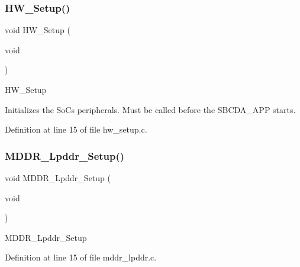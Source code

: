 \mbox{\label{group___h_w___setup_gaccfffcda3887f124927423457befe196}} 
\subsubsection{\texorpdfstring{H\+W\+\_\+\+Setup()}{HW\_Setup()}}
{\footnotesize\ttfamily void H\+W\+\_\+\+Setup (\begin{DoxyParamCaption}\item[{void}]{ }\end{DoxyParamCaption})}

H\+W\+\_\+\+Setup

Initializes the SoC\textquotesingle{}s peripherals. Must be called before the S\+B\+C\+D\+A\+\_\+\+A\+PP starts. 

Definition at line 15 of file hw\+\_\+setup.\+c.

\mbox{\label{group___h_w___setup_ga289e48a62669d5b08693d32a8ed773a9}} 
\subsubsection{\texorpdfstring{M\+D\+D\+R\+\_\+\+Lpddr\+\_\+\+Setup()}{MDDR\_Lpddr\_Setup()}}
{\footnotesize\ttfamily void M\+D\+D\+R\+\_\+\+Lpddr\+\_\+\+Setup (\begin{DoxyParamCaption}\item[{void}]{ }\end{DoxyParamCaption})}

M\+D\+D\+R\+\_\+\+Lpddr\+\_\+\+Setup 

Definition at line 15 of file mddr\+\_\+lpddr.\+c.

